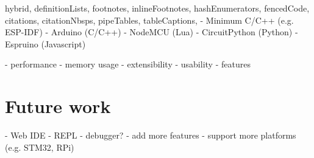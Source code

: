 \documentclass[
  digital,
  oneside,
  nosansbold,
  nocolorbold,
  lof,
  lot
]{fithesis4}
\begin{document}
\begin{markdown*}{%
  hybrid,
  definitionLists,
  footnotes,
  inlineFootnotes,
  hashEnumerators,
  fencedCode,
  citations,
  citationNbsps,
  pipeTables,
  tableCaptions,
}
  - Minimum C/C++ (e.g. ESP-IDF)
  - Arduino (C/C++)
  - NodeMCU (Lua)
  - CircuitPython (Python)
  - Espruino (Javascript)

  - performance
  - memory usage
  - extensibility
  - usability
  - features


\chapter{Future work}

  - Web IDE
  - REPL
  - debugger?
  - add more features
  - support more platforms (e.g. STM32, RPi)

\end{markdown*}
\end{document}
